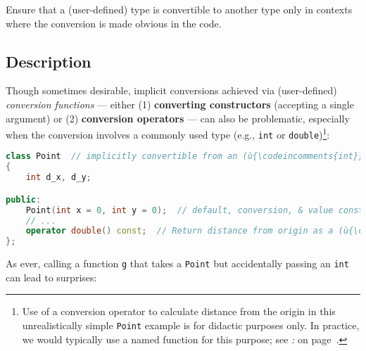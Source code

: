 

\setcounter{table}{0}
\setcounter{footnote}{0}
\setcounter{lstlisting}{0}


Ensure that a (user-defined) type is convertible to another type only in
contexts where the conversion is made obvious in the code.

\subsection[Description]{Description}\label{description-explicitconv}

Though sometimes desirable, implicit conversions achieved via (user-defined) \emph{conversion
functions} --- either (1) \textbf{converting constructors} (accepting a
single argument) or (2) \textbf{conversion operators} --- can also be problematic, especially when the
conversion involves a commonly used type (e.g., \texttt{int} or
\texttt{double}){\cprotect\footnote{Use of a conversion operator to
calculate distance from the origin in this unrealistically simple \texttt{Point}
example is for didactic purposes only. In practice, we would typically
use a named function for this purpose; see {\it{}: } on page~\pageref{sometimes-a-named-function-is-better}.}}:

\begin{lstlisting}[language=C++]
class Point  // implicitly convertible from an (ù{\codeincomments{int}}ù) or to a (ù{\codeincomments{double}}ù)
{
    int d_x, d_y;

public:
    Point(int x = 0, int y = 0);  // default, conversion, & value constructor
    // ...
    operator double() const;  // Return distance from origin as a (ù{\codeincomments{double}}ù).
};
\end{lstlisting}

\noindent As ever, calling a function \texttt{g} that takes a \texttt{Point} but
accidentally passing an \texttt{int} can lead to surprises:

